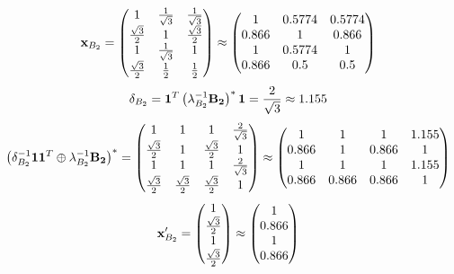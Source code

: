 \documentclass[10pt,a4paper]{article}
\begin{document}
	\[
		\bold{x}_{B_2} = 
		\begin{pmatrix}
			{1} {} & \frac{1} {\sqrt{3}} & \frac{1} {\sqrt{3}} \\
			\frac{\sqrt{3}} {{2}} & {1} {} & \frac{\sqrt{3}} {{2}} \\
			{1} {} & \frac{1} {\sqrt{3}} & {1} {} \\
			\frac{\sqrt{3}} {{2}} & \frac{1} {{2}} & \frac{1} {{2}} \\
		\end{pmatrix}
		\approx
		\begin{pmatrix}
			1        & 0.5774   & 0.5774   \\
			0.866    & 1        & 0.866    \\
			1        & 0.5774   & 1        \\
			0.866    & 0.5      & 0.5      \\
		\end{pmatrix}
	\]
	\[
		\delta_{B_2} = \bold{1}^T \left(\lambda_{B_2}^{-1}\bold{B_2}\right)^* \bold{1} = \frac{{2}} {\sqrt{3}}\approx 1.155
	\]
	\[
		\left(\delta_{B_2}^{-1}\bold{11}^T \oplus \lambda_{B_2}^{-1}\bold{B_2}\right)^* = 
		\begin{pmatrix}
			{1} {} & {1} {} & {1} {} & \frac{{2}} {\sqrt{3}} \\
			\frac{\sqrt{3}} {{2}} & {1} {} & \frac{\sqrt{3}} {{2}} & {1} {} \\
			{1} {} & {1} {} & {1} {} & \frac{{2}} {\sqrt{3}} \\
			\frac{\sqrt{3}} {{2}} & \frac{\sqrt{3}} {{2}} & \frac{\sqrt{3}} {{2}} & {1} {} \\
		\end{pmatrix}
		\approx
		\begin{pmatrix}
			1        & 1        & 1        & 1.155    \\
			0.866    & 1        & 0.866    & 1        \\
			1        & 1        & 1        & 1.155    \\
			0.866    & 0.866    & 0.866    & 1        \\
		\end{pmatrix}
	\]
	\[
		\bold{x}'_{B_2} = 
		\begin{pmatrix}
			{1} {} \\
			\frac{\sqrt{3}} {{2}} \\
			{1} {} \\
			\frac{\sqrt{3}} {{2}} \\
		\end{pmatrix}
		\approx
		\begin{pmatrix}
			1        \\
			0.866    \\
			1        \\
			0.866    \\
		\end{pmatrix}
	\]
\end{document}

